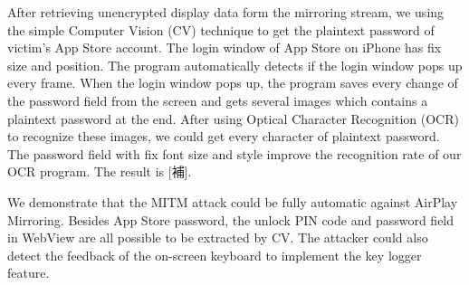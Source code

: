 After retrieving unencrypted display data form the mirroring stream, we using the simple Computer Vision (CV) technique to get the plaintext password of victim's App Store account. The login window of App Store on iPhone has fix size and position. The program automatically detects if the login window pops up every frame. When the login window pops up, the program saves every change of the password field from the screen and gets several images which contains a plaintext password at the end. After using Optical Character Recognition (OCR) to recognize these images, we could get every character of plaintext password. The password field with fix font size and style improve the recognition rate of our OCR program. The result is [補].

We demonstrate that the MITM attack could be fully automatic against AirPlay Mirroring. Besides App Store password, the unlock PIN code and password field in WebView are all possible to be extracted by CV. The attacker could also detect the feedback of the on-screen keyboard to implement the key logger feature.

